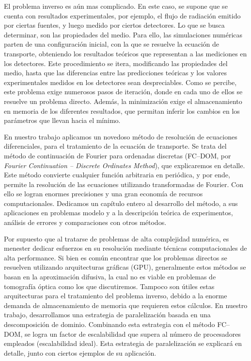 El problema inverso es aún mas complicado. 
En este caso, se supone que se cuenta con resultados experimentales, 
por ejemplo, el flujo de radiación emitido por ciertas fuentes, 
y luego medido por ciertos detectores. 
Lo que se busca determinar, son las propiedades del medio.  
Para ello, las simulaciones numéricas parten de   
una configuración inicial, con la que se resuelve la ecuación de transporte, 
obteniendo los resultados teóricos que representan a las 
mediciones en los detectores. 
Este procedimiento se itera, modificando las propiedades del medio, hasta que las 
diferencias entre las predicciones teóricas y los valores experimentales 
medidos en los detectores sean despreciables.
Como se percibe, este problema exige numerosos pasos de iteración, 
donde en cada uno de ellos se resuelve un problema directo. 
Además, la minimización exige el almacenamiento en memoria de 
los diferentes resultados, que permitan inferir los cambios en 
los parámetros que llevan hacia el mínimo.

En nuestro trabajo aplicamos un novedoso método de resolución de 
ecuaciones diferenciales, para el tratamiento de la ecuación de 
transporte. Se trata del método de continuación de Fourier para 
ordenadas discretas (FC--DOM, por {\it Fourier Continuation -- Discrete 
Ordinates Method}), que explicaremos en detalle. 
Este método convierte cualquier función arbitraria en 
periódica, y por ende, permite la resolución de las ecuaciones 
utilizando transformadas de Fourier. Con ello se logran enormes 
precisiones y una gran economía de recursos computacionales.
Dedicamos un capítulo entero al desarrollo del método, a
sus aplicaciones en problemas modelo y a la descripción teórica de 
experimentos, análisis de errores y comparaciones con 
otros métodos.

Por supuesto que al tratarse de problemas de alta complejidad 
numérica, es menester dedicar esfuerzos en su resolución mediante 
técnicas computacionales de alta performance. 
Si bien es común encontrar que los problemas directos se resuelven 
utilizando arquitecturas gráficas (GPU), generalmente estos 
métodos se basan en la aproximación difusiva, la cual no es 
viable en problemas de tomografía óptica como los que discutiremos.
Tampoco son útiles estas arquitecturas para el tratamiento del 
problema inverso, debido a la enorme demanda de almacenamiento 
de memoria que requieren estos cálculos.
En nuestro trabajo, desarrollamos una estrategia de paralelización 
basada en una descomposición de dominio. Combinando esta estrategia 
con el método FC--DOM, se logra un factor de escalabilidad que supera 
al número de procesadores empleados (escalabilidad ideal).
Esta estrategia de paralelización se explicará en detalle, 
junto con ciertos ejemplos de su aplicación.

